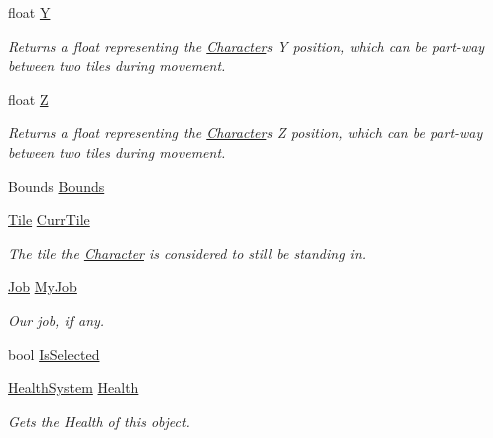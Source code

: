 \begin{DoxyCompactItemize}
float \hyperlink{class_project_porcupine_1_1_entities_1_1_character_a5c2f36d8758d9e982456af01fddb5997}{Y}
\begin{DoxyCompactList}\small\item\em Returns a float representing the \hyperlink{class_project_porcupine_1_1_entities_1_1_character}{Character}\textquotesingle{}s Y position, which can be part-\/way between two tiles during movement. \end{DoxyCompactList}\item 
float \hyperlink{class_project_porcupine_1_1_entities_1_1_character_a9c149d9a477af33818b602cf6dfa9ea5}{Z}
\begin{DoxyCompactList}\small\item\em Returns a float representing the \hyperlink{class_project_porcupine_1_1_entities_1_1_character}{Character}\textquotesingle{}s Z position, which can be part-\/way between two tiles during movement. \end{DoxyCompactList}\item 
Bounds \hyperlink{class_project_porcupine_1_1_entities_1_1_character_a14bb1214e9ebcc8b1cebc805e2574f85}{Bounds}
\item 
\hyperlink{class_tile}{Tile} \hyperlink{class_project_porcupine_1_1_entities_1_1_character_ad25bedfb01beb7d9dfca1dad6ba937e0}{Curr\+Tile}
\begin{DoxyCompactList}\small\item\em The tile the \hyperlink{class_project_porcupine_1_1_entities_1_1_character}{Character} is considered to still be standing in. \end{DoxyCompactList}\item 
\hyperlink{class_job}{Job} \hyperlink{class_project_porcupine_1_1_entities_1_1_character_af58d5df398e6a77b97bc6d38cf52f800}{My\+Job}
\begin{DoxyCompactList}\small\item\em Our job, if any. \end{DoxyCompactList}\item 
bool \hyperlink{class_project_porcupine_1_1_entities_1_1_character_a9a5ce9d0a1138bba9b929a27069d9de4}{Is\+Selected}
\item 
\hyperlink{class_health_system}{Health\+System} \hyperlink{class_project_porcupine_1_1_entities_1_1_character_a583d507f17c0164d156f735172fab042}{Health}
\begin{DoxyCompactList}\small\item\em Gets the Health of this object. \end{DoxyCompactList}\end{DoxyCompactItemize}
